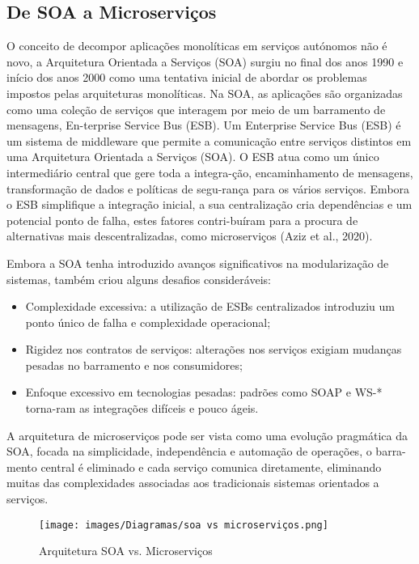 \subsection{De SOA a Microserviços}

O conceito de decompor aplicações monolíticas em serviços autónomos não é novo, a Arquitetura Orientada a Serviços (SOA) surgiu no final dos anos 1990 e início dos anos 2000 como uma tentativa inicial de abordar os problemas impostos pelas arquiteturas monolíticas. Na SOA, as aplicações são organizadas como uma coleção de serviços que interagem por meio de um barramento de mensagens, En-terprise Service Bus (ESB).
Um Enterprise Service Bus (ESB) é um sistema de middleware que permite a comunicação entre serviços distintos em uma Arquitetura Orientada a Serviços (SOA). O ESB atua como um único intermediário central que gere toda a integra-ção, encaminhamento de mensagens, transformação de dados e políticas de segu-rança para os vários serviços. Embora o ESB simplifique a integração inicial, a sua centralização cria dependências e um potencial ponto de falha, estes fatores contri-buíram para a procura de alternativas mais descentralizadas, como microserviços (Aziz et al., 2020).


Embora a SOA tenha introduzido avanços significativos na modularização de sistemas, também criou alguns desafios consideráveis:

\begin{itemize}
    \item Complexidade excessiva: a utilização de ESBs centralizados introduziu um ponto único de falha e complexidade operacional;
    \item Rigidez nos contratos de serviços: alterações nos serviços exigiam mudanças pesadas no barramento e nos consumidores;
    \item Enfoque excessivo em tecnologias pesadas: padrões como SOAP e WS-* torna-ram as integrações difíceis e pouco ágeis.
\end{itemize}

A arquitetura de microserviços pode ser vista como uma evolução pragmática da SOA, focada na simplicidade, independência e automação de operações, o barra-mento central é eliminado e cada serviço comunica diretamente, eliminando muitas das complexidades associadas aos tradicionais sistemas orientados a serviços.

\begin{figure}[h]
    \centering
    \texttt{[image: images/Diagramas/soa vs microserviços.png]}
    \caption{Arquitetura SOA vs. Microserviços}
\end{figure}

